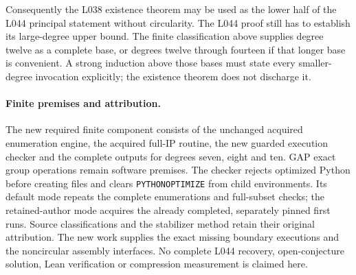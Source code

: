 \documentclass[11pt,a4paper]{article}
\begin{document}
Consequently the L038 existence theorem may be used as the
lower half of the L044 principal statement without circularity.
The L044 proof still has to establish its large-degree upper
bound. The finite classification above supplies degree twelve
as a complete base, or degrees twelve through fourteen if
that longer base is convenient. A strong induction above
those bases must state every smaller-degree invocation
explicitly; the existence theorem does not discharge it.

\paragraph{Finite premises and attribution.}
The new required finite component consists of the unchanged
acquired enumeration engine, the acquired full-IP routine,
the new guarded execution checker and the complete outputs
for degrees seven, eight and ten. GAP exact group operations
remain software premises. The checker rejects optimized
Python before creating files and clears \texttt{PYTHONOPTIMIZE}
from child environments. Its default mode repeats the complete
enumerations and full-subset checks; the retained-author mode
acquires the already completed, separately pinned first runs.
Source classifications and the stabilizer method retain their
original attribution. The new work supplies the exact missing
boundary executions and the noncircular assembly interfaces.
No complete L044 recovery, open-conjecture solution, Lean
verification or compression measurement is claimed here.
\end{document}
